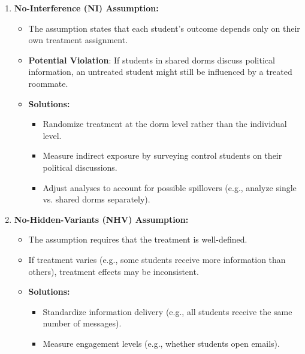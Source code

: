 \documentclass[12pt]{article}
\begin{document}
\begin{enumerate}
\begin{enumerate}[label=(\alph*)]
    \item \textbf{No-Interference (NI) Assumption:}
    \begin{itemize}
        \item The assumption states that each student's outcome depends only on their own treatment assignment.
        \item \textbf{Potential Violation}: If students in shared dorms discuss political information, an untreated student might still be influenced by a treated roommate.
        \item \textbf{Solutions:}
        \begin{itemize}
            \item Randomize treatment at the dorm level rather than the individual level.
            \item Measure indirect exposure by surveying control students on their political discussions.
            \item Adjust analyses to account for possible spillovers (e.g., analyze single vs. shared dorms separately).
        \end{itemize}
    \end{itemize}

    \item \textbf{No-Hidden-Variants (NHV) Assumption:}
    \begin{itemize}
        \item The assumption requires that the treatment is well-defined.
        \item If treatment varies (e.g., some students receive more information than others), treatment effects may be inconsistent.
        \item \textbf{Solutions:}
        \begin{itemize}
            \item Standardize information delivery (e.g., all students receive the same number of messages).
            \item Measure engagement levels (e.g., whether students open emails).
        \end{itemize}
    \end{itemize}


\end{enumerate}
\end{enumerate}
\end{document}

